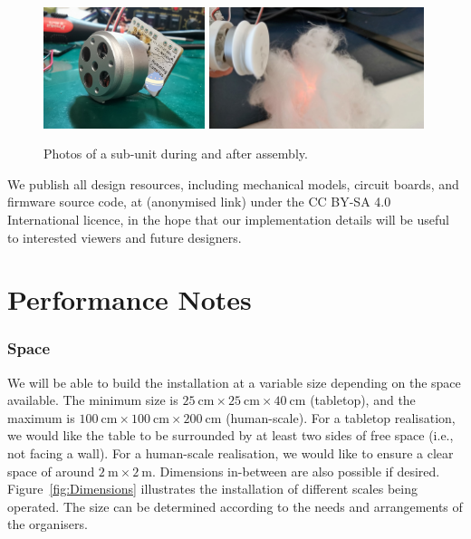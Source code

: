 \documentclass{nimemusic}
\begin{document}
\begin{figure}[h!]
  \includegraphics[width=0.42\textwidth]{Motor.jpg}
  \includegraphics[width=0.56\textwidth]{Cloud.jpg}
  \caption{Photos of a sub-unit during and after assembly.}
  \label{fig:Sub-unit}
\end{figure}

We publish all design resources, including mechanical models, circuit boards, and firmware source code, at (anonymised link) under the CC BY-SA 4.0 International licence, in the hope that our implementation details will be useful to interested viewers and future designers.

\section{Performance Notes}
\label{sect:Perf_Notes}

\subsubsection{Space}
We will be able to build the installation at a variable size depending on the space available. The minimum size is $25\ \text{cm} \times 25\ \text{cm} \times 40\ \text{cm}$ (tabletop), and the maximum is $100\ \text{cm} \times 100\ \text{cm} \times 200\ \text{cm}$ (human-scale). For a tabletop realisation, we would like the table to be surrounded by at least two sides of free space (i.e., not facing a wall). For a human-scale realisation, we would like to ensure a clear space of around $2\ \text{m} \times 2\ \text{m}$. Dimensions in-between are also possible if desired. Figure~\ref{fig:Dimensions} illustrates the installation of different scales being operated. The size can be determined according to the needs and arrangements of the organisers.
\end{document}
